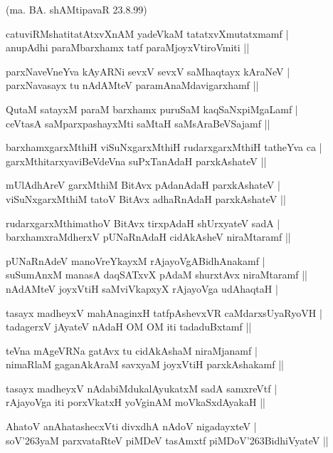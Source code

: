 \begin{itemize}
{\hfill{(ma. BA. shAMtipavaR 23.8.99)}
\item[36.] catuviRMshatitatAtxvXnAM yadeVkaM tatatxvXmutatxmamf |\\\label{150}
anupAdhi paraMbarxhamx tatf paraMjoyxVtiroVmiti ||
\item[37.] parxNaveVneYva kAyARNi sevxV sevxV saMhaqtayx kAraNeV |\\\label{150}
parxNavasayx tu nAdAMteV paramAnaMdavigarxhamf ||
\item[38.] QutaM satayxM paraM barxhamx puruSaM kaqSaNxpiMgaLamf |\\\label{150}
ceVtasA saMparxpashayxMti saMtaH saMsAraBeVSajamf ||
\item[39.] barxhamxgarxMthiH viSuNxgarxMthiH rudarxgarxMthiH tatheYva ca |\\\label{150}
garxMthitarxyaviBeVdeVna suPxTanAdaH parxkAshateV ||
\item[40.] mUlAdhAreV garxMthiM BitAvx pAdanAdaH parxkAshateV |\\
viSuNxgarxMthiM tatoV BitAvx adhaRnAdaH parxkAshateV ||
\item[41.] rudarxgarxMthimathoV BitAvx tirxpAdaH shUrxyateV sadA |\\
barxhamxraMdherxV pUNaRnAdaH cidAkAsheV niraMtaramf ||
\item[42.] pUNaRnAdeV manoVreYkayxM rAjayoVgABidhAnakamf |\\
suSumAnxM manasA daqSATxvX pAdaM shurxtAvx niraMtaramf ||\\
nAdAMteV joyxVtiH saMviVkapxyX rAjayoVga udAhaqtaH |
\item[43.] tasayx madheyxV mahAnaginxH tatfpAshevxVR caMdarxsUyaRyoVH |\\\label{150}
tadagerxV jAyateV nAdaH OM OM iti tadaduBxtamf ||
\item[44.] teVna mAgeVRNa gatAvx tu cidAkAshaM niraMjanamf |\\
nimaRlaM gaganAkAraM savxyaM joyxVtiH parxkAshakamf ||
\item[45.] tasayx madheyxV nAdabiMdukalAyukatxM sadA samxreVtf |\\
rAjayoVga iti porxVkatxH yoVginAM moVkaSxdAyakaH ||
\item[46.] AhatoV anAhatashecxVti divxdhA nAdoV nigadayxteV |\\\label{150}
soV\char'263yaM parxvataRteV piMDeV tasAmxtf piMDoV\char'263BidhiVyateV ||

}
\end{itemize}
